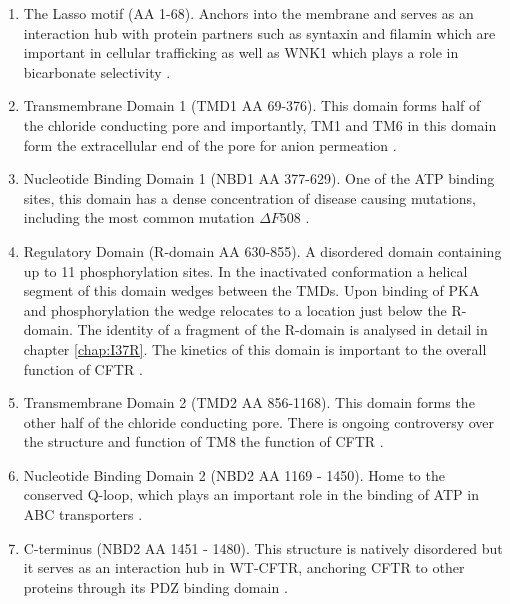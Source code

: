 \begin{enumerate}
	\item The Lasso motif (AA 1-68). Anchors into the membrane and serves as an interaction hub with protein partners such as syntaxin and filamin which are important in cellular trafficking \cite{cormet-boyaka2002, naren1998, thelin2007} as well as WNK1 which plays a role in bicarbonate selectivity \cite{kim2019}.
	\item Transmembrane Domain 1 (TMD1 AA 69-376). This domain forms half of the chloride conducting pore and importantly, TM1 and TM6 in this domain form the extracellular end of the pore for anion permeation \cite{linsdell2006, linsdell2022}.
	\item Nucleotide Binding Domain 1 (NBD1 AA 377-629). One of the ATP binding sites, this domain has a dense concentration of disease causing mutations, including the most common mutation $\Delta F508$ \cite{cftr2}.
	\item Regulatory Domain (R-domain AA 630-855). A disordered domain containing up to 11 phosphorylation sites\cite{mihalyi2020}. In the inactivated conformation a helical segment of this domain wedges between the TMDs. Upon binding of PKA and phosphorylation the wedge relocates to a location just below the R-domain. The identity of a fragment of the R-domain is analysed in detail in chapter \ref{chap:I37R}. The kinetics of this domain is important to the overall function of CFTR \cite{ostedgaard2000, mihalyi2020}. 
	\item Transmembrane Domain 2 (TMD2 AA 856-1168). This domain forms the other half of the chloride conducting pore. There is ongoing controversy over the structure and function of TM8 the function of CFTR \cite{hegedus2022, liu2019}.
	\item Nucleotide Binding Domain 2 (NBD2 AA 1169 - 1450). Home to the conserved Q-loop, which plays an important role in the binding of ATP in ABC transporters \cite{ivey2020, zolnerciks2014, dong2015}.
	\item C-terminus (NBD2 AA 1451 - 1480). This structure is natively disordered but it serves as an interaction hub in WT-CFTR, anchoring CFTR to other proteins through its PDZ binding domain \cite{moyer1999, cushing2008}. 

\end{enumerate}



